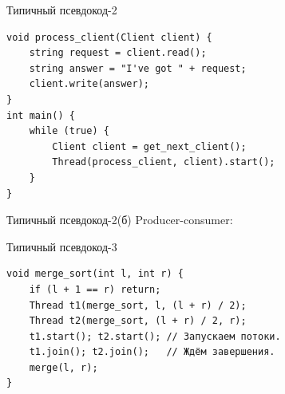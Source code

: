 \begin{frame}[fragile]{Типичный псевдокод-2}
\begin{verbatim}
void process_client(Client client) {
    string request = client.read();
    string answer = "I've got " + request;
    client.write(answer);
}
int main() {
    while (true) {
        Client client = get_next_client();
        Thread(process_client, client).start();
    }
}
\end{verbatim}
\end{frame}

\begin{frame}{Типичный псевдокод-2(б)}
	Producer-consumer:

\end{frame}

\begin{frame}[fragile]{Типичный псевдокод-3}
\begin{verbatim}
void merge_sort(int l, int r) {
    if (l + 1 == r) return;
    Thread t1(merge_sort, l, (l + r) / 2);
    Thread t2(merge_sort, (l + r) / 2, r);
    t1.start(); t2.start(); // Запускаем потоки.
    t1.join(); t2.join();   // Ждём завершения.
    merge(l, r);
}
\end{verbatim}
\end{frame}
